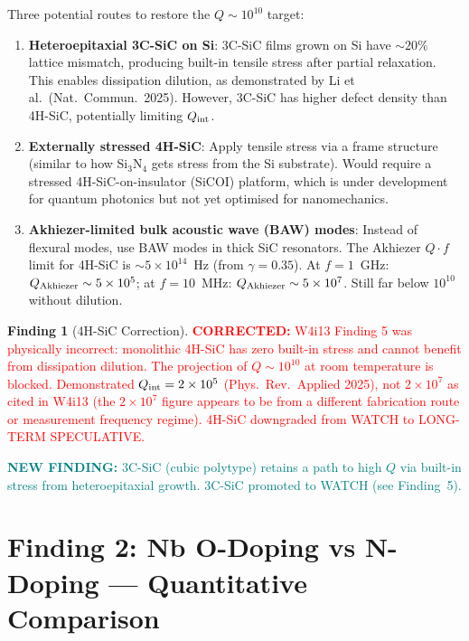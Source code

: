 \documentclass[11pt]{article}
\theoremstyle{definition}
\newtheorem{finding}[theorem]{Finding}
\theoremstyle{remark}
\newcommand{\ee}[1]{\times 10^{#1}}
\newcommand{\corrected}[1]{\textcolor{red}{\textbf{CORRECTED:} #1}}
\newcommand{\newfinding}[1]{\textcolor{teal}{\textbf{NEW FINDING:} #1}}
\begin{document}
Three potential routes to restore the $Q \sim 10^{10}$ target:

\begin{enumerate}[nosep]
\item \textbf{Heteroepitaxial 3C-SiC on Si}: 3C-SiC films grown on
  Si have $\sim 20\%$ lattice mismatch, producing built-in tensile
  stress after partial relaxation. This enables dissipation dilution,
  as demonstrated by Li et al.\ (Nat.\ Commun.\ 2025). However,
  3C-SiC has higher defect density than 4H-SiC, potentially limiting
  $Q_{\rm int}$.

\item \textbf{Externally stressed 4H-SiC}: Apply tensile stress via
  a frame structure (similar to how Si$_3$N$_4$ gets stress from
  the Si substrate). Would require a stressed 4H-SiC-on-insulator
  (SiCOI) platform, which is under development for quantum photonics
  but not yet optimised for nanomechanics.

\item \textbf{Akhiezer-limited bulk acoustic wave (BAW) modes}:
  Instead of flexural modes, use BAW modes in thick SiC resonators.
  The Akhiezer $Q \cdot f$ limit for 4H-SiC is $\sim 5\ee{14}$~Hz
  (from $\gamma = 0.35$). At $f = 1$~GHz: $Q_{\rm Akhiezer} \sim
  5\ee{5}$; at $f = 10$~MHz: $Q_{\rm Akhiezer} \sim 5\ee{7}$.
  Still far below $10^{10}$ without dilution.
\end{enumerate}

\begin{finding}[4H-SiC Correction]
\label{find:sic_correction}
\corrected{W4i13 Finding 5 was physically incorrect: monolithic 4H-SiC
has zero built-in stress and cannot benefit from dissipation dilution.
The projection of $Q \sim 10^{10}$ at room temperature is blocked.
Demonstrated $Q_{\rm int} = 2\ee{5}$ (Phys.\ Rev.\ Applied 2025),
not $2\ee{7}$ as cited in W4i13 (the $2\ee{7}$ figure appears to be
from a different fabrication route or measurement frequency regime).
4H-SiC downgraded from WATCH to LONG-TERM SPECULATIVE.}

\newfinding{3C-SiC (cubic polytype) retains a path to high $Q$ via
built-in stress from heteroepitaxial growth. 3C-SiC promoted to
WATCH (see Finding~5).}
\end{finding}


\section{Finding 2: Nb O-Doping vs N-Doping --- Quantitative Comparison}
\label{sec:o_doping}
\end{document}
